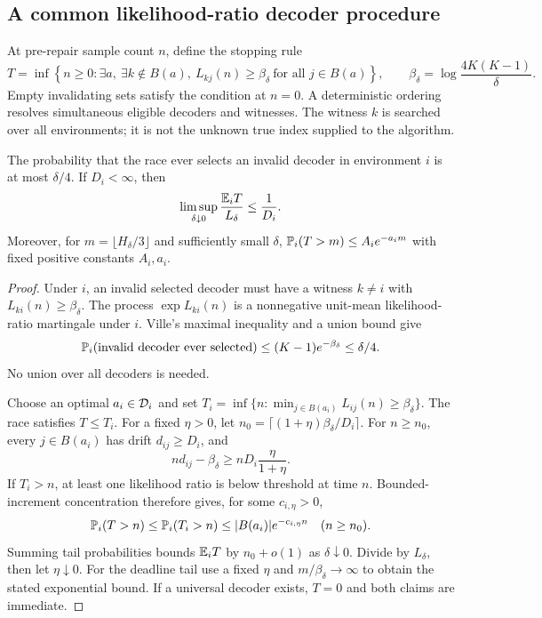 \subsection{A common likelihood-ratio decoder procedure}
At pre-repair sample count $n$, define the stopping rule
\begin{equation}\label{eq:race}
T=\inf\left\{n\ge0:
  \exists a,\ \exists k\notin B(a),\
  L_{kj}(n)\ge\beta_\delta\ \text{for all }j\in B(a)\right\},
\qquad
\beta_\delta=\log\frac{4K(K-1)}{\delta}.
\end{equation}
Empty invalidating sets satisfy the condition at $n=0$.
A deterministic ordering resolves simultaneous eligible decoders and witnesses.
The witness $k$ is searched over all environments; it is not the unknown true
index supplied to the algorithm.

\begin{lemma}\label{lem:race}
The probability that the race ever selects an invalid decoder in environment
$i$ is at most $\delta/4$. If $D_i<\infty$, then
\[
 \limsup_{\delta\downarrow0}\frac{\mathbb E_iT}{L_\delta}\le\frac1{D_i}.
\]
Moreover, for $m=\lfloor H_\delta/3\rfloor$ and sufficiently small $\delta$,
$\mathbb P_i(T>m)\le A_i e^{-a_i m}$ with fixed positive constants $A_i,a_i$.
\end{lemma}
\begin{proof}
Under $i$, an invalid selected decoder must have a witness $k\ne i$
with $L_{ki}(n)\ge\beta_\delta$. The process
$\exp L_{ki}(n)$ is a nonnegative unit-mean likelihood-ratio martingale
under $i$. Ville's maximal inequality and a union bound give
\[
 \mathbb P_i(\text{invalid decoder ever selected})
 \le(K-1)e^{-\beta_\delta}\le\delta/4.
\]
No union over all decoders is needed.

Choose an optimal $a_i\in\mathcal D_i$ and set
$T_i=\inf\{n:\min_{j\in B(a_i)}L_{ij}(n)\ge\beta_\delta\}$.
The race satisfies $T\le T_i$. For a fixed $\eta>0$, let
$n_0=\lceil(1+\eta)\beta_\delta/D_i\rceil$. For $n\ge n_0$,
every $j\in B(a_i)$ has drift $d_{ij}\ge D_i$, and
\[
 nd_{ij}-\beta_\delta\ge nD_i\frac{\eta}{1+\eta}.
\]
If $T_i>n$, at least one likelihood ratio is below threshold at time $n$.
Bounded-increment concentration therefore gives, for some $c_{i,\eta}>0$,
\[
 \mathbb P_i(T>n)\le\mathbb P_i(T_i>n)
 \le |B(a_i)|e^{-c_{i,\eta}n}\quad(n\ge n_0).
\]
Summing tail probabilities bounds $\mathbb E_iT$ by $n_0+o(1)$ as
$\delta\downarrow0$. Divide by $L_\delta$, then let $\eta\downarrow0$.
For the deadline tail use a fixed $\eta$ and
$m/\beta_\delta\to\infty$ to obtain the stated exponential bound.
If a universal decoder exists, $T=0$ and both claims are immediate.
\end{proof}

